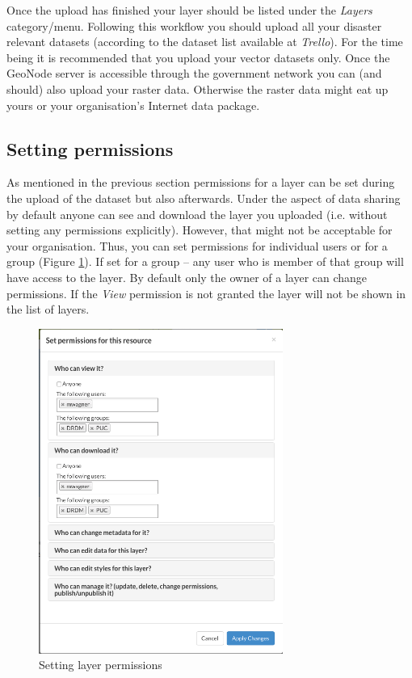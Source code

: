 \documentclass[a4paper,12pt,titlepage]{article}
\begin{document}
Once the upload has finished your layer should be listed under the \textit{Layers} category/menu.
Following this workflow you should upload all your disaster relevant datasets (according to the dataset list available at \textit{Trello}).
For the time being it is recommended that you upload your vector datasets only. Once the GeoNode server is accessible through the government network you can (and should) also upload your raster data. Otherwise the raster data might eat up yours or your organisation's Internet data package.

\subsection{Setting permissions}

As mentioned in the previous section permissions for a layer can be set during the upload of the dataset but also afterwards. Under the aspect of data sharing by default anyone can see and download the layer you uploaded (i.e. without setting any permissions explicitly). However, that might not be acceptable for your organisation. Thus, you can set permissions for individual users or for a group (Figure \ref{fig:permissions}). If set for a group -- any user who is member of that group will have access to the layer. By default only the owner of a layer can change permissions. If the \textit{View} permission is not granted the layer will not be shown in the list of layers.

\begin{figure}[H]
	\centering
	\includegraphics[width=8cm]{Images/permissions.png}
	\caption{Setting layer permissions}\label{fig:permissions}
\end{figure}
\end{document}
